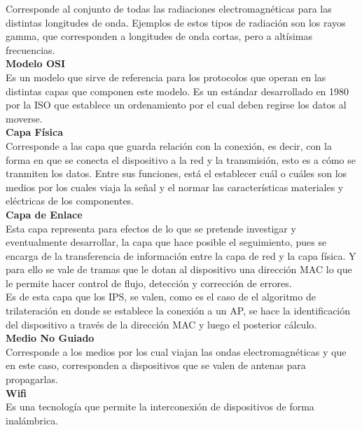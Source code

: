 Corresponde al conjunto de todas las radiaciones electromagnéticas para las distintas longitudes de onda. Ejemplos de estos tipos de radiación son los rayos gamma, que corresponden a longitudes de onda cortas, pero a altísimas frecuencias.\\

\textbf{Modelo OSI}\\

Es un modelo que sirve de referencia para los protocolos que operan en las distintas capas que componen este modelo. Es un estándar desarrollado en 1980 por la ISO que establece un ordenamiento por el cual deben regirse los datos al moverse.\\

\textbf{Capa Física}\\

Corresponde a las capa que guarda relación con la conexión, es decir, con la forma en que se conecta el dispositivo a la red y la transmisión, esto es a cómo se tranmiten los datos. Entre sus funciones, está el establecer cuál o cuáles son los medios por los cuales viaja la señal y el normar las características materiales y eléctricas de los componentes.\\

\textbf{Capa de Enlace}\\
Esta capa representa para efectos de lo que se pretende investigar y eventualmente desarrollar, la capa que hace posible el seguimiento, pues se encarga de la transferencia de información entre la capa de red y la capa física. Y para ello se vale de tramas que le dotan al dispositivo una dirección \ac{MAC} lo que le permite hacer control de flujo, detección y corrección de errores.\\

Es de esta capa que los IPS, se valen, como es el caso de el algoritmo de trilateración en donde se establece la conexión a un AP, se hace la identificación del dispositivo a través de la dirección MAC y luego el posterior cálculo.\\

\textbf{Medio No Guiado}\\

Corresponde a los medios por los cual viajan las ondas electromagnéticas y que en este caso, corresponden a dispositivos que se valen de antenas para propagarlas.\\

\textbf{Wifi}\\

Es una tecnología que permite la interconexión de dispositivos de forma inalámbrica.\\


